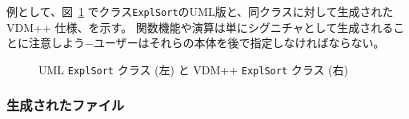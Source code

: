 \documentclass[\pformat,12pt]{jarticle}
\newcommand{\vdmpp}{VDM++}
\begin{document}
例として、図~\ref{fig:ExplSortVDMUML} でクラス{\tt ExplSort}のUML版と、同クラスに対して生成された \vdmpp{} 仕様、を示す。
関数機能や演算は単にシグニチャとして生成されることに注意しよう−ユーザーはそれらの本体を後で指定しなければならない。


\begin{figure}[htb]
\begin{center}
\mbox{}
\hspace{0.2cm}
\caption{UML {\tt ExplSort} クラス (左) と \vdmpp{} {\tt ExplSort} クラス (右)　\label{fig:ExplSortVDMUML}}
\end{center}
\end{figure}

\subsubsection*{生成されたファイル}
\end{document}
